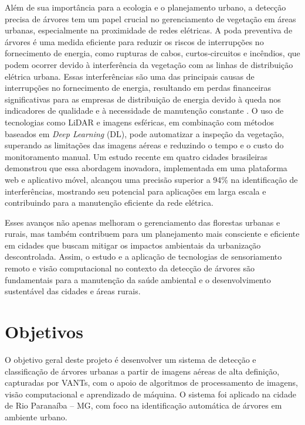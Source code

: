 \documentclass[
    12pt,                   %
    openright,              %
    oneside,                %
    a4paper,                %
    sumario=tradicional,    %
    english,                %
    brazil,                 %
    ]{abntex2}
\begin{document}
    Além de sua importância para a ecologia e o planejamento urbano, a detecção precisa de árvores tem um papel crucial no gerenciamento de vegetação em áreas urbanas, especialmente na proximidade de redes elétricas. A poda preventiva de árvores é uma medida eficiente para reduzir os riscos de interrupções no fornecimento de energia, como rupturas de cabos, curtos-circuitos e incêndios, que podem ocorrer devido à interferência da vegetação com as linhas de distribuição elétrica urbana. Essas interferências são uma das principais causas de interrupções no fornecimento de energia, resultando em perdas financeiras significativas para as empresas de distribuição de energia devido à queda nos indicadores de qualidade e à necessidade de manutenção constante \cite{bergmann2024approach}. O uso de tecnologias como LiDAR e imagens esféricas, em combinação com métodos baseados em \textit{Deep Learning} (DL), pode automatizar a inspeção da vegetação, superando as limitações das imagens aéreas e reduzindo o tempo e o custo do monitoramento manual. Um estudo recente em quatro cidades brasileiras demonstrou que essa abordagem inovadora, implementada em uma plataforma web e aplicativo móvel, alcançou uma precisão superior a 94\% na identificação de interferências, mostrando seu potencial para aplicações em larga escala e contribuindo para a manutenção eficiente da rede elétrica.

    Esses avanços não apenas melhoram o gerenciamento das florestas urbanas e rurais, mas também contribuem para um planejamento mais consciente e eficiente em cidades que buscam mitigar os impactos ambientais da urbanização descontrolada. Assim, o estudo e a aplicação de tecnologias de sensoriamento remoto e visão computacional no contexto da detecção de árvores são fundamentais para a manutenção da saúde ambiental e o desenvolvimento sustentável das cidades e áreas rurais.

\chapter{Objetivos}\label{sec:objetivos}
  O objetivo geral deste projeto é desenvolver um sistema de detecção e classificação 
de árvores urbanas a partir de imagens aéreas de alta definição, capturadas por VANTs, 
com o apoio de algoritmos de processamento de imagens, visão computacional e aprendizado 
de máquina. O sistema foi aplicado na cidade de Rio Paranaíba -- MG, com foco na 
identificação automática de árvores em ambiente urbano.
\end{document}
